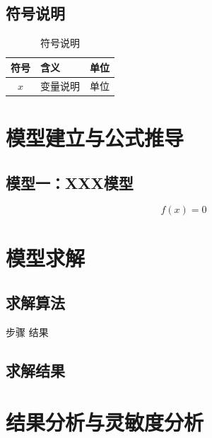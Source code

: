 \subsection{符号说明}
\begin{table}[H]
  \centering
  \caption{符号说明}
  \begin{tabular}{cll}
    \toprule
    符号 & 含义 & 单位 \\
    \midrule
    $x$ & 变量说明 & 单位 \\
    \bottomrule
  \end{tabular}
\end{table}

\section{模型建立与公式推导}

\subsection{模型一：XXX模型}
\begin{equation}
  f(x) = 0
  \label{eq:model1}
\end{equation}

\section{模型求解}

\subsection{求解算法}
\begin{algorithm}[H]
  \caption{算法名称}
  步骤\;
  \Return 结果\;
\end{algorithm}

\subsection{求解结果}

\section{结果分析与灵敏度分析}

